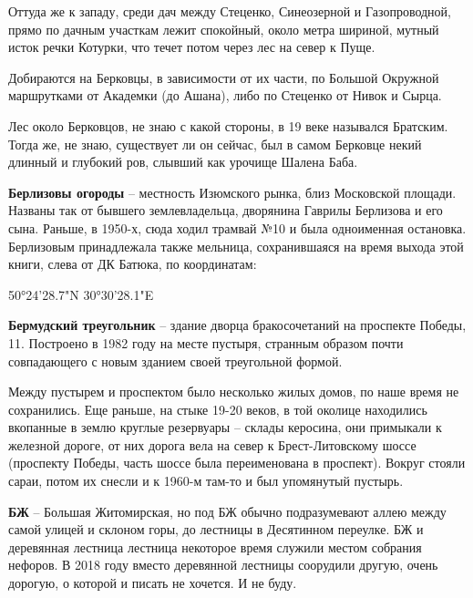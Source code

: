 Оттуда же к западу, среди дач между Стеценко, Синеозерной и Газопроводной, прямо по дачным участкам лежит спокойный, около метра шириной, мутный исток речки Котурки, что течет потом через лес на север к Пуще.

Добираются на Берковцы, в зависимости от их части, по Большой Окружной маршрутками от Академки (до Ашана), либо по Стеценко от Нивок и Сырца.

Лес около Берковцов, не знаю с какой стороны, в 19 веке назывался Братским. Тогда же, не знаю, существует ли он сейчас, был в самом Берковце некий длинный и глубокий ров, слывший как урочище Шалена Баба.\\

\medskip


\textbf{Берлизовы огороды} – местность Изюмского рынка, близ Московской площади. Названы так от бывшего землевладельца, дворянина Гаврилы Берлизова и его сына. Раньше, в 1950-х, сюда ходил трамвай №10 и была одноименная остановка. Берлизовым принадлежала также мельница, сохранившаяся на время выхода этой книги, слева от ДК Батюка, по координатам:

50°24'28.7"N 30°30'28.1"E\\

\medskip

\textbf{Бермудский треугольник} – здание дворца бракосочетаний на проспекте Победы, 11. Построено в 1982 году на месте пустыря, странным образом почти совпадающего с новым зданием своей треугольной формой.

Между пустырем и проспектом было несколько жилых домов, по наше время не сохранились. Еще раньше, на стыке 19-20 веков, в той околице находились вкопанные в землю круглые резервуары – склады керосина, они примыкали к железной дороге, от них дорога вела на север к Брест-Литовскому шоссе (проспекту Победы, часть шоссе была переименована в проспект). Вокруг стояли сараи, потом их снесли и к 1960-м там-то и был упомянутый пустырь.\\

\medskip

\textbf{БЖ} – Большая Житомирская, но под БЖ обычно подразумевают аллею между самой улицей и склоном горы, до лестницы в Десятинном переулке. БЖ и деревянная лестница лестница некоторое время служили местом собрания нефоров. В 2018 году вместо деревянной лестницы соорудили другую, очень дорогую, о которой и писать не хочется. И не буду.\\

\medskip


